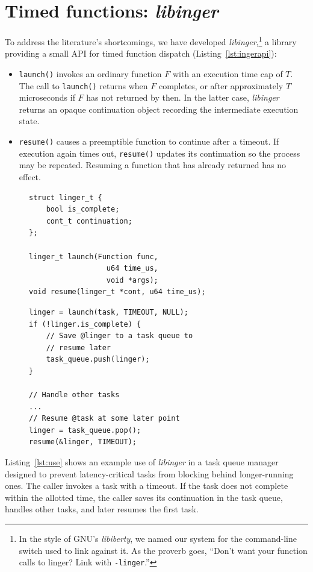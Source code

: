 \section{Timed functions: \textit{libinger}}
\label{sec:libinger}

To address the literature's shortcomings, we have developed
\textit{libinger},\footnote{In the style of GNU's \textit{libiberty}, we named our
system for the command-line switch used to link against it.  As the proverb goes,
``Don't want your function calls to linger?  Link with \texttt{-linger}.''}
a library providing a small API for timed function dispatch
(Listing~\ref{lst:ingerapi}):
\begin{itemize}
\item \texttt{launch()} invokes an ordinary function $F$ with an
execution time cap of $T$.  The call to \texttt{launch()} returns when $F$
completes, or after approximately $T$ microseconds if $F$ has not returned
by then.  In the latter case, \textit{libinger} returns an opaque continuation
object recording the intermediate execution state.
\item \texttt{resume()} causes a preemptible function to continue after a timeout.
If execution again times out, \texttt{resume()} updates its continuation so the
process may be repeated.  Resuming a function that has already returned has no
effect.
\end{itemize}

\begin{figure}[t]
\begin{lstlisting}[label=lst:ingerapi,caption=Preemptible functions core interface]
struct linger_t {
	bool is_complete;
	cont_t continuation;
};

linger_t launch(Function func,
                  u64 time_us,
                  void *args);
void resume(linger_t *cont, u64 time_us);
\end{lstlisting}
\begin{lstlisting}[label=lst:use, caption=Preemptible function usage example]
linger = launch(task, TIMEOUT, NULL);
if (!linger.is_complete) {
	// Save @linger to a task queue to
	// resume later
	task_queue.push(linger);
}

// Handle other tasks
...
// Resume @task at some later point
linger = task_queue.pop();
resume(&linger, TIMEOUT);
\end{lstlisting}
\end{figure}

Listing~\ref{lst:use} shows an example use of \textit{libinger}
in a task queue manager designed to prevent latency-critical tasks from blocking
behind longer-running
ones. The caller invokes a task with a timeout. If the task does not complete
within the allotted time, the caller saves its continuation in the task queue,
handles other tasks, and later resumes the first task.

